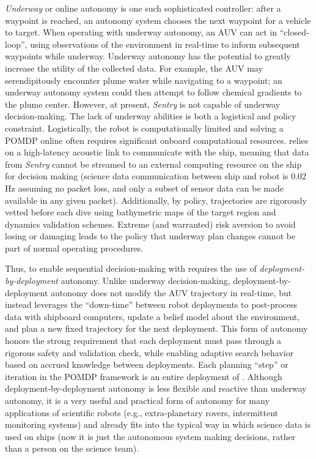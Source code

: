 \textit{Underway} or online autonomy is one such sophisticated controller: after a waypoint is reached, an autonomy system chooses the next waypoint for a vehicle to target. When operating with underway autonomy, an AUV can act in ``closed-loop'', using observations of the environment in real-time to inform subsequent waypoints while underway. Underway autonomy has the potential to greatly increase the utility of the collected data. For example, the AUV may serendipitously encounter plume water while navigating to a waypoint; an underway autonomy system could then attempt to follow chemical gradients to the plume center. However, at present, \emph{Sentry} is not capable of underway decision-making. The lack of underway abilities is both a logistical and policy constraint. Logistically, the robot is computationally limited and solving a POMDP online often requires significant onboard computational resources. \Sentry relies on a high-latency acoustic link to communicate with the ship, meaning that data from \emph{Sentry} cannot be streamed to an external computing resource on the ship for decision making (science data communication between ship and robot is 0.02 Hz assuming no packet loss, and only a subset of sensor data can be made available in any given packet). Additionally, by policy, \Sentry trajectories are rigorously vetted before each dive using bathymetric maps of the target region and dynamics validation schemes. Extreme (and warranted) risk aversion to avoid losing or damaging \Sentry leads to the policy that underway plan changes cannot be part of normal operating procedures.


Thus, to enable sequential decision-making with \Sentry requires the use of \emph{deployment-by-deployment} autonomy. Unlike underway decision-making, deployment-by-deployment autonomy does not modify the AUV trajectory in real-time, but instead leverages the ``down-time'' between robot deployments to post-process data with shipboard computers, update a belief model about the environment, and plan a new fixed trajectory for the next deployment. This form of autonomy honors the strong requirement that each deployment must pass through a rigorous safety and validation check, while enabling adaptive search behavior based on accrued knowledge between deployments. Each planning ``step'' or iteration in the POMDP framework is an entire deployment of \Sentry. Although deployment-by-deployment autonomy is less flexible and reactive than underway autonomy, it is a very useful and practical form of autonomy for many applications of scientific robots (e.g., extra-planetary rovers, intermittent monitoring systems) and already fits into the typical way in which science data is used on ships (now it is just the autonomous system making decisions, rather than a person on the science team). %

